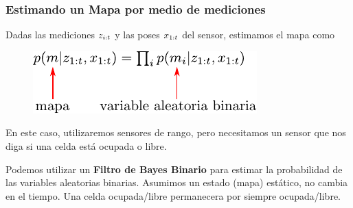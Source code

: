 \begin{frame}
	\frametitle{Estimando un Mapa por medio de mediciones}
	
	Dadas las mediciones $z_{i:t}$ y las poses $x_{1:t}$ del sensor, estimamos el mapa como
	
   	\begin{figure}[!h]
    \includegraphics[width=0.5\columnwidth]{./images/map_from_sensor_data.pdf}
    \end{figure}

    En este caso, utilizaremos sensores de rango, pero necesitamos un sensor que nos diga si una celda está ocupada o libre.
	
	
	Podemos utilizar un {\bf Filtro de Bayes Binario} para estimar la probabilidad de las variables aleatorias binarias. Asumimos un estado (mapa) estático, no cambia en el tiempo. Una celda ocupada/libre permanecera por siempre ocupada/libre.
	
\end{frame}

